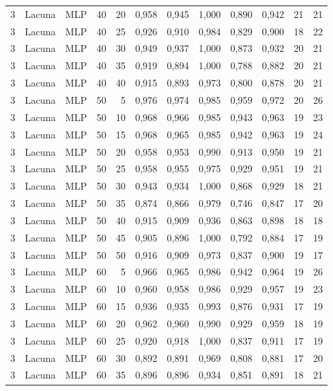 \begin{longtable}{@{}rllrrrrrrrrr@{}}
3 & Lacuna & MLP & 40 & 20 & 0,958 & 0,945 & 1,000 & 0,890 & 0,942 & 21 & 21 \\
3 & Lacuna & MLP & 40 & 25 & 0,926 & 0,910 & 0,984 & 0,829 & 0,900 & 18 & 22 \\
3 & Lacuna & MLP & 40 & 30 & 0,949 & 0,937 & 1,000 & 0,873 & 0,932 & 20 & 21 \\
3 & Lacuna & MLP & 40 & 35 & 0,919 & 0,894 & 1,000 & 0,788 & 0,882 & 20 & 21 \\
3 & Lacuna & MLP & 40 & 40 & 0,915 & 0,893 & 0,973 & 0,800 & 0,878 & 20 & 21 \\
3 & Lacuna & MLP & 50 & 5 & 0,976 & 0,974 & 0,985 & 0,959 & 0,972 & 20 & 26 \\
3 & Lacuna & MLP & 50 & 10 & 0,968 & 0,966 & 0,985 & 0,943 & 0,963 & 19 & 23 \\
3 & Lacuna & MLP & 50 & 15 & 0,968 & 0,965 & 0,985 & 0,942 & 0,963 & 19 & 24 \\
3 & Lacuna & MLP & 50 & 20 & 0,958 & 0,953 & 0,990 & 0,913 & 0,950 & 19 & 21 \\
3 & Lacuna & MLP & 50 & 25 & 0,958 & 0,955 & 0,975 & 0,929 & 0,951 & 19 & 21 \\
3 & Lacuna & MLP & 50 & 30 & 0,943 & 0,934 & 1,000 & 0,868 & 0,929 & 18 & 21 \\
3 & Lacuna & MLP & 50 & 35 & 0,874 & 0,866 & 0,979 & 0,746 & 0,847 & 17 & 20 \\
3 & Lacuna & MLP & 50 & 40 & 0,915 & 0,909 & 0,936 & 0,863 & 0,898 & 18 & 18 \\
3 & Lacuna & MLP & 50 & 45 & 0,905 & 0,896 & 1,000 & 0,792 & 0,884 & 17 & 19 \\
3 & Lacuna & MLP & 50 & 50 & 0,916 & 0,909 & 0,973 & 0,837 & 0,900 & 19 & 17 \\
3 & Lacuna & MLP & 60 & 5 & 0,966 & 0,965 & 0,986 & 0,942 & 0,964 & 19 & 26 \\
3 & Lacuna & MLP & 60 & 10 & 0,960 & 0,958 & 0,986 & 0,929 & 0,957 & 19 & 23 \\
3 & Lacuna & MLP & 60 & 15 & 0,936 & 0,935 & 0,993 & 0,876 & 0,931 & 17 & 19 \\
3 & Lacuna & MLP & 60 & 20 & 0,962 & 0,960 & 0,990 & 0,929 & 0,959 & 18 & 19 \\
3 & Lacuna & MLP & 60 & 25 & 0,920 & 0,918 & 1,000 & 0,837 & 0,911 & 17 & 19 \\
3 & Lacuna & MLP & 60 & 30 & 0,892 & 0,891 & 0,969 & 0,808 & 0,881 & 17 & 20 \\
3 & Lacuna & MLP & 60 & 35 & 0,896 & 0,896 & 0,934 & 0,851 & 0,891 & 18 & 21 \\

\end{longtable}
